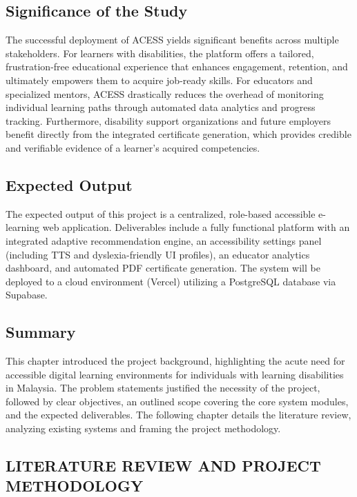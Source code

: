 \documentclass[12pt,a4paper]{report}
\begin{document}
\subsection{Significance of the Study}
The successful deployment of ACESS yields significant benefits across multiple stakeholders. For learners with disabilities, the platform offers a tailored, frustration-free educational experience that enhances engagement, retention, and ultimately empowers them to acquire job-ready skills. For educators and specialized mentors, ACESS drastically reduces the overhead of monitoring individual learning paths through automated data analytics and progress tracking. Furthermore, disability support organizations and future employers benefit directly from the integrated certificate generation, which provides credible and verifiable evidence of a learner's acquired competencies. 

\subsection{Expected Output}
The expected output of this project is a centralized, role-based accessible e-learning web application. Deliverables include a fully functional platform with an integrated adaptive recommendation engine, an accessibility settings panel (including TTS and dyslexia-friendly UI profiles), an educator analytics dashboard, and automated PDF certificate generation. The system will be deployed to a cloud environment (Vercel) utilizing a PostgreSQL database via Supabase.

\subsection{Summary}
This chapter introduced the project background, highlighting the acute need for accessible digital learning environments for individuals with learning disabilities in Malaysia. The problem statements justified the necessity of the project, followed by clear objectives, an outlined scope covering the core system modules, and the expected deliverables. The following chapter details the literature review, analyzing existing systems and framing the project methodology.

\vfill \null
\newpage

\vfill \null
\thispagestyle{empty}
\begin{center}
\section{LITERATURE REVIEW AND PROJECT METHODOLOGY}
\end{center}
\vspace{2cm}
\end{document}
